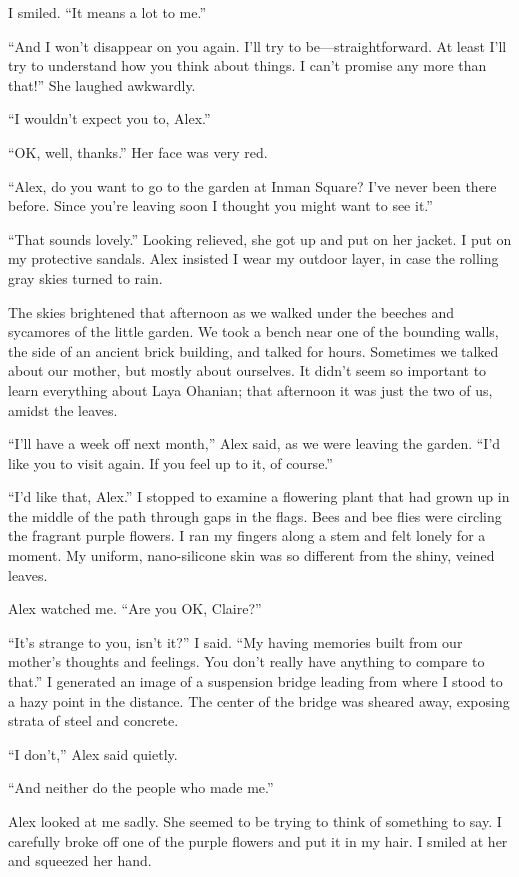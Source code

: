 \documentclass[10pt,b5paper]{article}
\begin{document}
I smiled. ``It means a lot to me.''

``And I won't disappear on you again. I'll try to
be---straightforward. At least I'll try to understand how you think
about things. I can't promise any more than that!'' She laughed
awkwardly.

``I wouldn't expect you to, Alex.''

``OK, well, thanks.'' Her face was very red.

``Alex, do you want to go to the garden at Inman Square? I've never
been there before. Since you're leaving soon I thought you might want
to see it.''

``That sounds lovely.'' Looking relieved, she got up and put on
her jacket. I put on my protective sandals. Alex insisted I wear my
outdoor layer, in case the rolling gray skies turned to rain.

\bigskip

The skies brightened that afternoon as we walked under the beeches
and sycamores of the little garden. We took a bench near one of the
bounding walls, the side of an ancient brick building, and talked
for hours. Sometimes we talked about our mother, but mostly about
ourselves. It didn't seem so important to learn everything about Laya
Ohanian; that afternoon it was just the two of us, amidst the leaves.

``I'll have a week off next month,'' Alex said, as we were leaving
the garden. ``I'd like you to visit again. If you feel up to it,
of course.''

``I'd like that, Alex.'' I stopped to examine a flowering plant
that had grown up in the middle of the path through gaps in the
flags. Bees and bee flies were circling the fragrant purple flowers. I
ran my fingers along a stem and felt lonely for a moment. My uniform,
nano-silicone skin was so different from the shiny, veined leaves.

Alex watched me. ``Are you OK, Claire?''

``It's strange to you, isn't it?'' I said. ``My having memories built
from our mother's thoughts and feelings. You don't really have anything
to compare to that.'' I generated an image of a suspension bridge
leading from where I stood to a hazy point in the distance. The center
of the bridge was sheared away, exposing strata of steel and concrete.

``I don't,'' Alex said quietly.

``And neither do the people who made me.''

Alex looked at me sadly. She seemed to be trying to think of something
to say. I carefully broke off one of the purple flowers and put it
in my hair. I smiled at her and squeezed her hand.
\end{document}
